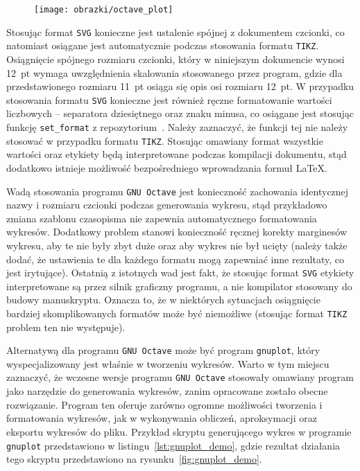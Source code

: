 \begin{listing}[p]
\inputminted{octave}{skrypty/octave_plot.m}
\end{listing}

\begin{figure}[htb]
\texttt{[image: obrazki/octave\_plot]}
\end{figure}

Stosując format \texttt{SVG} konieczne jest ustalenie spójnej z dokumentem czcionki, co natomiast osiągane jest automatycznie podczas stosowania formatu \texttt{TIKZ}. Osiągnięcie spójnego rozmiaru czcionki, który w niniejszym dokumencie wynosi \qty{12}{pt} wymaga uwzględnienia skalowania stosowanego przez program, gdzie dla przedstawionego rozmiaru \qty{11}{pt} osiąga się opis osi rozmiaru \qty{12}{pt}. W przypadku stosowania formatu \texttt{SVG} konieczne jest również ręczne formatowanie wartości liczbowych -- separatora dziesiętnego oraz znaku minusa, co osiągane jest stosując funkcję \verb|set_format| z repozytorium~\cite{auth_fwtutils}. Należy zaznaczyć, że funkcji tej nie należy stosować w przypadku formatu \texttt{TIKZ}. Stosując omawiany format wszystkie wartości oraz etykiety będą interpretowane podczas kompilacji dokumentu, stąd dodatkowo istnieje możliwość bezpośredniego wprowadzania formuł \LaTeX{}.

Wadą stosowania programu \texttt{GNU Octave} jest konieczność zachowania identycznej nazwy i rozmiaru czcionki podczas generowania wykresu, stąd przykładowo zmiana szablonu czasopisma nie zapewnia automatycznego formatowania wykresów. Dodatkowy problem stanowi konieczność ręcznej korekty marginesów wykresu, aby te nie były zbyt duże oraz aby wykres nie był ucięty (należy także dodać, że ustawienia te dla każdego formatu mogą zapewniać inne rezultaty, co jest irytujące). Ostatnią z istotnych wad jest fakt, że stosując format \texttt{SVG} etykiety interpretowane są przez silnik graficzny programu, a nie kompilator stosowany do budowy manuskryptu. Oznacza to, że w niektórych sytuacjach osiągnięcie bardziej skomplikowanych formatów może być niemożliwe (stosując format \texttt{TIKZ} problem ten nie występuje).

Alternatywą dla programu \texttt{GNU Octave} może być program \texttt{gnuplot}, który wyspecjalizowany jest właśnie w tworzeniu wykresów. Warto w tym miejscu zaznaczyć, że wczesne wersje programu \texttt{GNU Octave} stosowały omawiany program jako narzędzie do generowania wykresów, zanim opracowane zostało obecne rozwiązanie. Program ten oferuje zarówno ogromne możliwości tworzenia i formatowania wykresów, jak w wykonywania obliczeń, aproksymacji oraz eksportu wykresów do pliku. Przykład skryptu generującego wykres w programie \texttt{gnuplot} przedstawiono w listingu~\ref{lst:gnuplot_demo}, gdzie rezultat działania tego skryptu przedstawiono na rysunku~\ref{fig:gnuplot_demo}.

